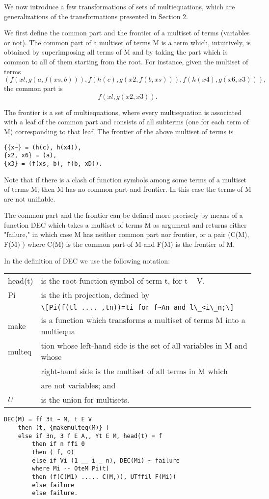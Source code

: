 
We now introduce a few transformations of sets of multiequations, which are
generalizations of the transformations presented in Section 2. 

We first define the common part and the frontier of a multiset of terms
(variables or not). The common part of a multiset of terms M is a term which,
intuitively, is obtained by superimposing all terms of M and by taking the part
which is common to all of them starting from the root. For instance, given the
multiset of terms
\[(f(xl, g(a, f(xs, b))), f(h(c), g(x2, f(b, xs))), f(h(x4), g(x6, x3))),\]
the common part is
\[f(xl, g(x2, x3)).\]

The frontier is a set of multiequations, where every multiequation is associated
with a leaf of the common part and consists of all subterms (one for each term of 
M) corresponding to that leaf. The frontier of the above multiset of terms is
\begin{verbatim}
{{x~} = (h(c), h(x4)),
{x2, x6} = (a),
{x3} = (f(xs, b), f(b, xD)).
\end{verbatim}

Note that if there is a clash of function symbols among some terms of a multiset
of terms M, then M has no common part and frontier. In this case the terms of M
are not unifiable. 

The common part and the frontier can be defined more precisely by means of
a function DEC which takes a multiset of terms M as argument and returns either
"failure," in which case M has neither common part nor frontier, or a pair (C(M),
F(M) ) where C(M) is the common part of M and F(M) is the frontier of M. 

In the definition of DEC we use the following notation: 

\begin{tabular}{l l}
head(t) & is the root function symbol of term t, for t ~ V. \\
Pi & is the ith projection, defined by\\&
\verb|\[Pi(f(tl .... ,tn))=ti for f~An and l\_<i\_n;\]|\\
make&is a function which transforms a multiset of terms M into a multiequa\\
multeq & tion whose left-hand side is the set of all variables in M and whose\\
&right-hand side is the multiset of all terms in M which \\&are not variables;
and \\
$U$ & is the union for multisets. \\
\end{tabular}
\begin{lstlisting}
DEC(M) = ff 3t ~ M, t E V
	then (t, {makemulteq(M)} )
	else if 3n, 3 f E A,, Yt E M, head(t) = f
		then if n ffi 0
		then ( f, O)
		else if Vi (1 __ i _ n), DEC(Mi) ~ failure
		where Mi -- OteM Pi(t)
		then (f(C(M1) ..... C(M,)), UTffil F(Mi))
		else failure
		else failure.   
\end{lstlisting}


